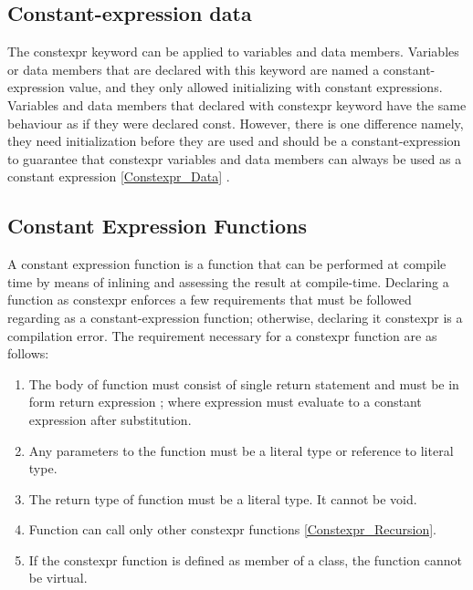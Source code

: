 \documentclass[11pt]{report}
\begin{document}
\subsection{Constant-expression data}
\label{subsection: constant-expression data}
The constexpr keyword can be applied to variables and data members.  Variables or data members that are declared with this keyword are named a constant-expression value, and they only allowed initializing with constant expressions. Variables and data members that declared with constexpr keyword have the same behaviour as if they were declared const. However, there is one difference namely, they need initialization before they are used and should be a constant-expression to guarantee that constexpr variables and data members can always be used as a constant expression \ref{Constexpr_Data} \cite{Williams:2012:CCA}.


\subsection{Constant Expression Functions}
\label{Constant Expression Functions}
A constant expression function is a function that can be performed at compile time by means of inlining and assessing the result at compile-time. Declaring a function as constexpr enforces a few requirements that must be followed regarding as a constant-expression function; otherwise, declaring it constexpr is a compilation error.  The requirement necessary for a constexpr function are as follows:

\begin{enumerate}
\item The body of function must consist of single return statement and must be in form {return expression ;} where expression must evaluate to a constant expression after substitution.

\item Any parameters to the function must be a literal type or reference to literal type.

\item The return type of function must be a literal type. It cannot be void.

\item Function can call only other constexpr functions \ref{Constexpr_Recursion}.

\item If the constexpr function is defined as member of a class, the function cannot be virtual.
\end{enumerate}
\end{document}
